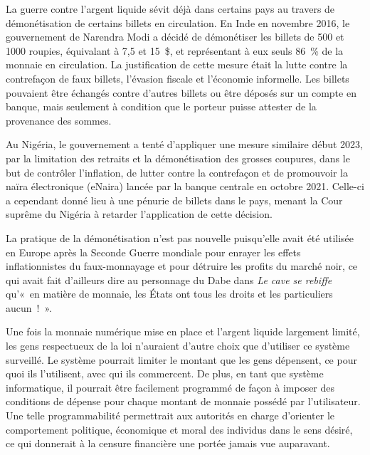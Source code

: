 La guerre contre l'argent liquide sévit déjà dans certains pays au travers de démonétisation de certains billets en circulation. En Inde en novembre 2016, le gouvernement de Narendra Modi a décidé de démonétiser les billets de 500 et 1000 roupies, équivalant à 7,5 et 15~\$, et représentant à eux seuls 86~\% de la monnaie en circulation. La justification de cette mesure était la lutte contre la contrefaçon de faux billets, l'évasion fiscale et l'économie informelle. Les billets pouvaient être échangés contre d'autres billets ou être déposés sur un compte en banque, mais seulement à condition que le porteur puisse attester de la provenance des sommes.

Au Nigéria, le gouvernement a tenté d'appliquer une mesure similaire début 2023, par la limitation des retraits et la démonétisation des grosses coupures, dans le but de contrôler l'inflation, de lutter contre la contrefaçon et de promouvoir la naïra électronique (eNaira) lancée par la banque centrale en octobre 2021. Celle-ci a cependant donné lieu à une pénurie de billets dans le pays, menant la Cour suprême du Nigéria à retarder l'application de cette décision.

La pratique de la démonétisation n'est pas nouvelle puisqu'elle avait été utilisée en Europe après la Seconde Guerre mondiale pour enrayer les effets inflationnistes du faux-monnayage et pour détruire les profits du marché noir, ce qui avait fait d'ailleurs dire au personnage du Dabe dans \emph{Le cave se rebiffe} qu'«~en matière de monnaie, les États ont tous les droits et les particuliers aucun~!~».

Une fois la monnaie numérique mise en place et l'argent liquide largement limité, les gens respectueux de la loi n'auraient d'autre choix que d'utiliser ce système surveillé. Le système pourrait limiter le montant que les gens dépensent, ce pour quoi ils l'utilisent, avec qui ils commercent. De plus, en tant que système informatique, il pourrait être facilement programmé de façon à imposer des conditions de dépense pour chaque montant de monnaie possédé par l'utilisateur. Une telle programmabilité permettrait aux autorités en charge d'orienter le comportement politique, économique et moral des individus dans le sens désiré, ce qui donnerait à la censure financière une portée jamais vue auparavant.

